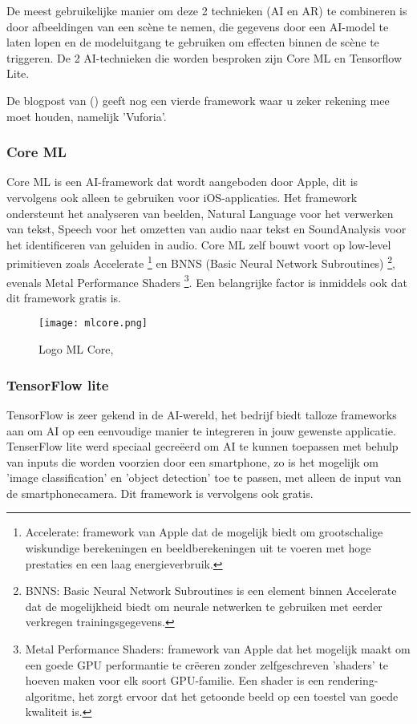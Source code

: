 De meest gebruikelijke manier om deze 2 technieken (AI en AR) te combineren is door afbeeldingen van een scène te nemen, die gegevens door een AI-model te laten lopen en de modeluitgang te gebruiken om effecten binnen de scène te triggeren. De 2 AI-technieken die worden besproken zijn Core ML en Tensorflow Lite.

De blogpost van \autocite{Girish2020} () geeft nog een vierde framework waar u zeker rekening mee moet houden, namelijk 'Vuforia'.

\subsubsection{Core ML}
Core ML is een AI-framework dat wordt aangeboden door Apple, dit is vervolgens ook alleen te gebruiken voor iOS-applicaties. Het framework ondersteunt het analyseren van beelden, Natural Language voor het verwerken van tekst, Speech voor het omzetten van audio naar tekst en SoundAnalysis voor het identificeren van geluiden in audio. Core ML zelf bouwt voort op low-level primitieven zoals Accelerate \footnote{Accelerate: framework van Apple dat de mogelijk biedt om grootschalige wiskundige berekeningen en beeldberekeningen uit te voeren met hoge prestaties en een laag energieverbruik.} en BNNS (Basic Neural Network Subroutines) \footnote{BNNS: Basic Neural Network Subroutines is een element binnen Accelerate dat de mogelijkheid biedt om neurale netwerken te gebruiken met eerder verkregen trainingsgegevens.}, evenals Metal Performance Shaders \footnote{Metal Performance Shaders: framework van Apple dat het mogelijk maakt om een goede GPU performantie te crëeren zonder zelfgeschreven 'shaders' te hoeven maken voor elk soort GPU-familie. Een shader is een rendering-algoritme, het zorgt ervoor dat het getoonde beeld op een toestel van goede kwaliteit is.}. Een belangrijke factor is inmiddels ook dat dit framework gratis is. \autocite{AppleML2020}


\begin{figure}[H]
	\centering
	\texttt{[image: mlcore.png]}
	\caption{Logo ML Core, \autocite{AppleML2020}}
\end{figure}

\subsubsection{TensorFlow lite}
TensorFlow is zeer gekend in de AI-wereld, het bedrijf biedt talloze frameworks aan om AI op een eenvoudige manier te integreren in jouw gewenste applicatie. TenserFlow lite werd speciaal gecreëerd om AI te kunnen toepassen met behulp van inputs die worden voorzien door een smartphone, zo is het mogelijk om 'image classification' en 'object detection' toe te passen, met alleen de input van de smartphonecamera. Dit framework is vervolgens ook gratis. \autocite{TensorFlowLite2020}

